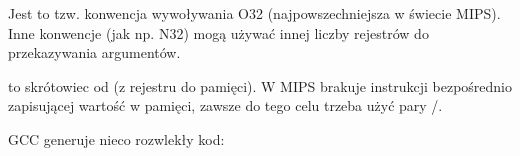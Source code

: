 Jest to tzw. konwencja wywoływania O32 (najpowszechniejsza w świecie MIPS).
Inne konwencje (jak np. N32) mogą używać innej liczby rejestrów do przekazywania argumentów.


 to skrótowiec od  (z rejestru do pamięci).
W MIPS brakuje instrukcji bezpośrednio zapisującej wartość w pamięci, zawsze do tego celu trzeba użyć pary /.






\NonOptimizing GCC generuje nieco rozwlekły kod:






